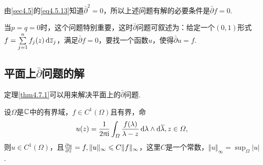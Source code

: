 由\ref{sec4.5}的\eqref{eq4.5.13}知道$\bar{\partial}^2=0$，所以上述问题有解的必要条件是$\bar{\partial}f=0$.

当$p=q=0$时，这个问题特别重要，这时$\bar{\partial}$问题可叙述为：给定一个$(0,1)$形式$f=\sum\limits_{j=1}^n f_j(z)\mathop{}\!\mathrm d{}\mkern1mu\overline{\mkern-1muz}_j$，满足$\bar{\partial}f=0$，要找一个函数$u$，使得$\bar{\partial}u=f$.
\subsection{平面上$\bar{\partial}$问题的解}
定理\ref{thm4.7.1}可以用来解决平面上的$\bar{\partial}$问题.
\begin{theorem}\label{thm4.7.2}
	设$\Omega$是$\mathbb C$中的有界域，$f\in C^1(\Omega)$且有界，命
	\begin{equation}\label{eq4.7.3}
		u(z)=\frac1{2\uppi\mathrm i}\int_\varOmega \frac{f(\lambda)}{\lambda-z}\mathop{}\!\mathrm{d}\lambda\wedge\mathop{}\!\mathrm{d}{}\mkern1mu\overline{\mkern-1mu\lambda},z\in\varOmega,
	\end{equation}
则$u\in C^1(\Omega)$，且$\frac{\partial u}{\partial {}\mkern1mu\overline{\mkern-1muz}}=f,\Vert u\Vert_\infty \leqslant C\Vert f\Vert_\infty$，这里$C$是一个常数，$\Vert u\Vert_\infty=\sup_\Omega |u|$.
\end{theorem}
